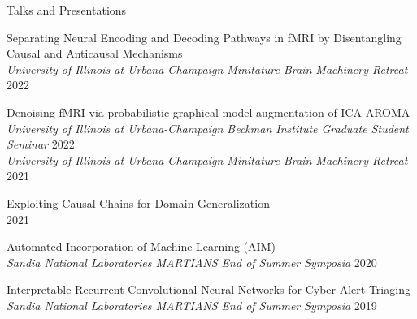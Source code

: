 \documentclass[11pt]{resume} %
\begin{document}

\begin{rSection}{Talks and Presentations}
\begin{etaremune}[label={\arabic*.},topsep=0pt,itemsep=5pt,partopsep=0pt,parsep=0pt]

    \item Separating Neural Encoding and Decoding Pathways in fMRI by Disentangling Causal and Anticausal Mechanisms \\
    \textit{University of Illinois at Urbana-Champaign Minitature Brain Machinery Retreat} \hfill 2022

    \item Denoising fMRI via probabilistic graphical model augmentation of ICA-AROMA \\
    \textit{University of Illinois at Urbana-Champaign Beckman Institute Graduate Student Seminar} \hfill 2022\\
    \textit{University of Illinois at Urbana-Champaign Minitature Brain Machinery Retreat} \hfill 2021

    \item Exploiting Causal Chains for Domain Generalization\\
     \hfill 2021 

    \item Automated Incorporation of Machine Learning (AIM)\\
    \textit{Sandia National Laboratories MARTIANS End of Summer Symposia} \hfill 2020

    \item Interpretable Recurrent Convolutional Neural Networks for Cyber Alert Triaging\\
    \textit{Sandia National Laboratories MARTIANS End of Summer Symposia} \hfill 2019
\end{etaremune}
\end{rSection}

\end{document}
